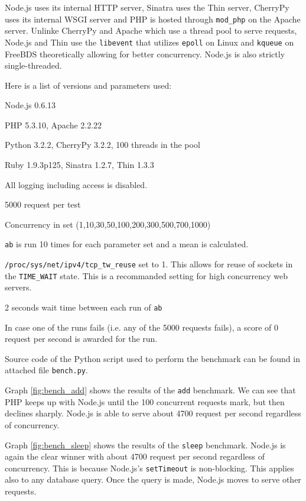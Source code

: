 \documentclass[12pt,oneside]{fithesis}
\begin{document}
		Node.js uses its internal HTTP server, Sinatra uses the Thin server, CherryPy uses its internal WSGI server and PHP is hosted through \texttt{mod\_php} on the Apache server. Unlinke CherryPy and Apache which use a thread pool to serve requests, Node.js and Thin use the \texttt{libevent} that utilizes \texttt{epoll} on Linux and \texttt{kqueue} on FreeBDS theoretically allowing for better concurrency. Node.js is also strictly single-threaded.
	
		Here is a list of versions and parameters used:
		\begin{compactitem}
			\item Node.js 0.6.13
			\item PHP 5.3.10, Apache 2.2.22
			\item Python 3.2.2, CherryPy 3.2.2, 100 threads in the pool
			\item Ruby 1.9.3p125, Sinatra 1.2.7, Thin 1.3.3
			\item All logging including access is disabled.
			\item 5000 request per test
			\item Concurrency in set (1,10,30,50,100,200,300,500,700,1000)
			\item \texttt{ab} is run 10 times for each parameter set and a mean is calculated.
			\item \texttt{/proc/sys/net/ipv4/tcp\_tw\_reuse} set to 1. This allows for reuse of sockets in the \texttt{TIME\_WAIT} state. This is a recommanded setting for high concurrency web servers. 
			\item 2 seconds wait time between each run of \texttt{ab}
			\item In case one of the runs fails (i.e. any of the 5000 requests fails), a score of 0 request per second is awarded for the run.
			\item Source code of the Python script used to perform the benchmark can be found in attached file \texttt{bench.py}.
		\end{compactitem}
		
		Graph \ref{fig:bench_add} shows the results of the \texttt{add} benchmark. We can see that PHP keeps up with Node.js until the 100 concurrent requests mark, but then declines sharply. Node.js is able to serve about 4700 request per second regardless of concurrency.
		
		Graph \ref{fig:bench_sleep} shows the results of the \texttt{sleep} benchmark. Node.js is again the clear winner with about 4700 request per second regardless of concurrency. This is because Node.js's \texttt{setTimeout} is non-blocking. This applies also to any database query. Once the query is made, Node.js moves to serve other requests.
		
\end{document}
